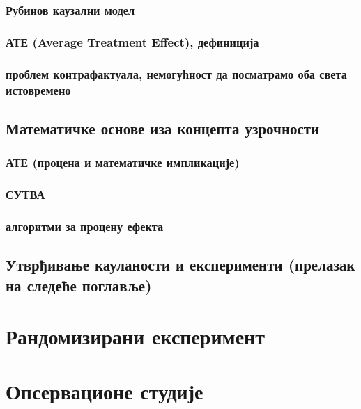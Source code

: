 \documentclass[12pt, a4paper]{article}
\begin{document}
    \subsubsection{Рубинов каузални модел}
    \subsubsection{АТЕ (Average Treatment Effect), дефиниција}
    \subsubsection{проблем контрафактуала, немогућност да посматрамо оба света истовремено}
\subsection{Математичке основе иза концепта узрочности}
    \subsubsection{АТЕ (процена и математичке импликације)}
    \subsubsection{СУТВА}
    \subsubsection{алгоритми за процену ефекта}
\subsection{Утврђивање кауланости и експерименти (прелазак на следеће поглавље)}

\newpage



\section{Рандомизирани експеримент}
\newpage



\section{Опсервационе студије}
\end{document}
